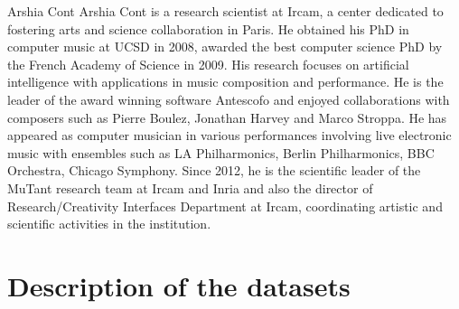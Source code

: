 \documentclass[10pt,journal,compsoc]{IEEEtran}
\begin{document}
\begin{IEEEbiography}{Arshia Cont}
Arshia Cont is a research scientist at Ircam, a center dedicated to fostering arts and science collaboration in Paris. He obtained his PhD in computer music at UCSD in 2008, awarded the best computer science PhD by the French Academy of Science in 2009. His research focuses on artificial intelligence with applications in music composition and performance. He is the leader of the award winning software Antescofo and enjoyed collaborations with composers such as Pierre Boulez, Jonathan Harvey and Marco Stroppa. He has appeared as computer musician in various performances involving live electronic music with ensembles such as LA Philharmonics, Berlin Philharmonics, BBC Orchestra, Chicago Symphony. Since 2012, he is the scientific leader of the MuTant research team at Ircam and Inria and also the director of Research/Creativity Interfaces Department at Ircam, coordinating artistic and scientific activities in the institution.
\end{IEEEbiography}




\appendix

\section{Description of the datasets}
\label{sec:appendix}
  
\end{document}

